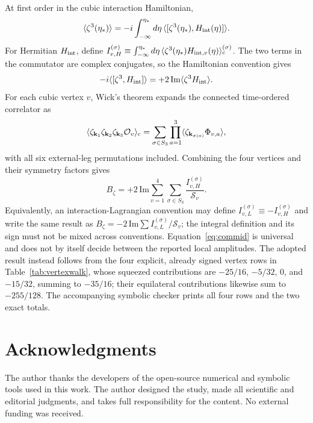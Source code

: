 \documentclass[aps,prd,twocolumn,superscriptaddress,showpacs,preprintnumbers,nofootinbib,longbibliography,floatfix]{revtex4-2}
\begin{document}
At first order in the cubic interaction Hamiltonian,
\begin{equation}
\langle\zeta^3(\eta_*)\rangle=-i\int_{-\infty}^{\eta_*}d\eta\,
\langle[\zeta^3(\eta_*),H_{\rm int}(\eta)]\rangle .
\label{eq:inin}
\end{equation}
For Hermitian $H_{\rm int}$, define
$I_{v,H}^{(\sigma)}\equiv\int_{-\infty}^{\eta_*}d\eta\,
\langle\zeta^3(\eta_*)H_{{\rm int},v}(\eta)\rangle_{\rm c}^{(\sigma)}$.
The two terms in the commutator are complex conjugates, so the Hamiltonian
convention gives
\begin{equation}
-i\langle[\zeta^3,H_{\rm int}]\rangle
=+2\,\mathrm{Im}\langle\zeta^3H_{\rm int}\rangle .
\label{eq:commid}
\end{equation}
For each cubic vertex $v$, Wick's theorem expands the connected time-ordered correlator as
\begin{equation}
\langle\zeta_{\mathbf{k}_1}\zeta_{\mathbf{k}_2}\zeta_{\mathbf{k}_3}\mathcal O_v\rangle_{\rm c}
=\sum_{\sigma\in S_3}\prod_{a=1}^{3}
\langle\zeta_{\mathbf{k}_{\sigma(a)}}\Phi_{v,a}\rangle ,
\label{eq:wick}
\end{equation}
with all six external-leg permutations included. Combining the four vertices and their symmetry factors gives
\begin{equation}
B_\zeta=+2\,\mathrm{Im}\sum_{v=1}^{4}\sum_{\sigma\in S_3}
\frac{I_{v,H}^{(\sigma)}}{\mathcal S_v} .
\label{eq:Bfull}
\end{equation}
Equivalently, an interaction-Lagrangian convention may define
$I_{v,L}^{(\sigma)}\equiv-I_{v,H}^{(\sigma)}$ and write the same result as
$B_\zeta=-2\,\mathrm{Im}\sum I_{v,L}^{(\sigma)}/\mathcal S_v$; the integral
definition and its sign must not be mixed across conventions. Equation~\eqref{eq:commid}
is universal and does not by itself decide between the reported local amplitudes.
The adopted result instead follows from the four explicit, already signed vertex rows in
Table~\ref{tab:vertexwalk}, whose squeezed contributions are $-25/16$, $-5/32$, $0$,
and $-15/32$, summing to $-35/16$; their equilateral contributions likewise sum to
$-255/128$. The accompanying symbolic checker prints all four rows and the two exact totals.

\section*{Acknowledgments}

The author thanks the developers of the open-source numerical and symbolic tools used in this work. The author designed the study, made all scientific and editorial judgments, and takes full responsibility for the content. No external funding was received.


\end{document}
